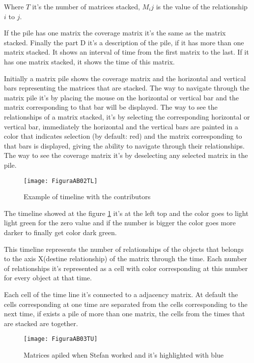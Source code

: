 Where $T$ it's the number of matrices stacked, $M_ij$ is the value of the relationship $i$ to $j$.

If the pile has one matrix the coverage matrix it's the same as the matrix stacked.
Finally the part D it's a description of the pile, if it has more than one matrix stacked. It shows an interval of time from the first matrix to the last. If it has one matrix stacked, it shows the time of this matrix.

Initially a matrix pile shows the coverage matrix and the horizontal and vertical bars representing the matrices that are stacked. The way to navigate through the matrix pile it's by placing the mouse on the horizontal or vertical bar and the matrix corresponding to that bar will be displayed. The way to see the relationships of a matrix stacked, it's by selecting the corresponding horizontal or vertical bar, immediately the horizontal and the vertical bars are painted in a color that indicates selection (by default: red) and the matrix corresponding to that bars is displayed, giving the ability to navigate through their relationships. The way to see the coverage matrix it's by deselecting any selected matrix in the pile.

\begin{figure}[h]
    \centering
    \texttt{[image: FiguraAB02TL]}
    \caption{Example of timeline with the contributors}
    \label{fig:TL}
\end{figure}

The timeline showed at the figure \ref{fig:TL} it's at the left top and the color goes to light light green for the zero value and if the number is bigger the color goes more darker to finally get color dark green. 

This timeline represents the number of relationships of the objects that belongs to the axis X(destine relationship) of the matrix through the time. Each number of relationships it's represented as a cell with color corresponding at this number for every object at that time.

Each cell of the time line it's connected to a adjacency matrix. At default the cells corresponding at one time are separated from the cells corresponding to the next time, if exists a pile of more than one matrix, the cells from the times that are stacked are together.

\begin{figure}[h]
    \centering
    \texttt{[image: FiguraAB03TU]}
    \caption{Matrices apiled when Stefan worked and it's highlighted with blue}
    \label{fig:TU}
\end{figure}

